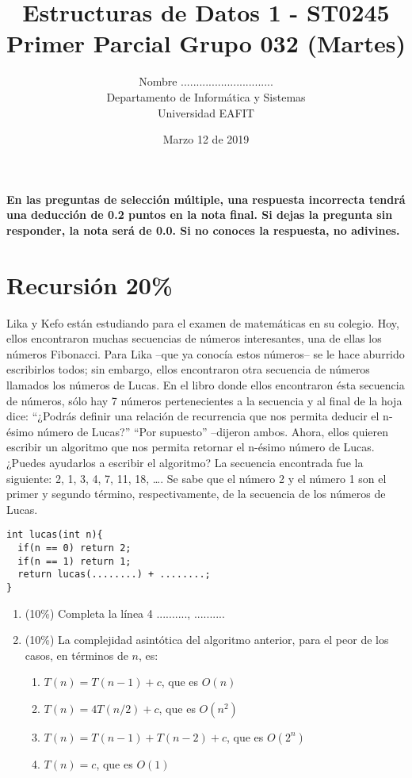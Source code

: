 \documentclass[10 pt]{article}
\title{\textbf {Estructuras de Datos 1 - ST0245\\Primer Parcial Grupo 032 (Martes)}}
\author{Nombre ..............................\\
		Departamento de Informática y Sistemas\\
		Universidad EAFIT\\}
\date{Marzo 12 de 2019}
\begin{document}
\lstset{escapechar=@,style=customc, numbers=left, stepnumber = 1} 
\maketitle
\begin{multicols}{2}
\textbf{En las preguntas de selección múltiple, una respuesta incorrecta tendrá
una deducción de 0.2 puntos en la nota final. Si dejas la pregunta sin
responder, la nota será de 0.0. Si no conoces la respuesta, no adivines.}


\section{Recursión 20\%}
Lika y Kefo están estudiando para el examen de matemáticas en su colegio. Hoy, ellos encontraron muchas secuencias de números interesantes, una de ellas los números Fibonacci. Para Lika --que ya conocía estos números-- se le hace aburrido escribirlos todos; sin embargo, ellos encontraron otra secuencia de números llamados los números de Lucas. En el libro donde ellos encontraron ésta secuencia de números, sólo hay 7 números pertenecientes a la secuencia y al final de la hoja dice: “¿Podrás definir una relación de recurrencia que nos permita deducir el n-ésimo número de Lucas?” 
“Por supuesto” --dijeron ambos. Ahora, ellos quieren escribir un algoritmo que nos permita retornar el n-ésimo número de Lucas. ¿Puedes ayudarlos a escribir el algoritmo? La secuencia encontrada fue la siguiente:
2, 1, 3, 4, 7, 11, 18, …. 
Se sabe que el número 2 y el número 1 son el primer y segundo término, respectivamente, de la secuencia de los números de Lucas.
\begin{lstlisting}
int lucas(int n){
  if(n == 0) return 2;
  if(n == 1) return 1;
  return lucas(........) + ........;
}
\end{lstlisting}
\begin{enumerate}[label=(\alph*)]
	\item (10\%) Completa la línea 4 .........., ..........
	\item (10\%) La complejidad asintótica del algoritmo anterior, para el peor de los casos, en términos de $n$, es:	
	\begin{enumerate}[label=(\roman*)]
		\item $T(n) = T(n-1) + c$, que es $O(n)$
		\item $T(n) = 4T(n/2) + c$, que es $O(n^2)$
		\item $T(n) = T(n-1) + T(n-2) + c$, que es $O(2^n)$
		\item $T(n) = c$, que es $O(1)$
	\end{enumerate}
\end{enumerate}

\end{multicols}
\end{document}
